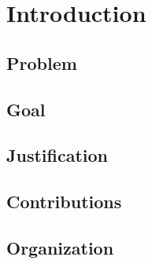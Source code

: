 \chapter{Introduction}
\label{chp:introduction}


\section{Problem}
\lipsum[1-2]


\section{Goal}
\lipsum[3-4]


\section{Justification}
\lipsum[5-6]


\section{Contributions}
\lipsum[7-8]


\section{Organization}
\lipsum[9-10]
